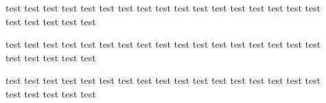 ﻿\documentclass{ctexart}
\begin{document}
    test test test test test test test test test test test test test test test test test\\ test test test test test 

    test test test test test test test test test test test test test test test test test\hspace{20em}\\ test test test test test

    test test test test test test test test test test test test test test test test test\\\hspace{20em} test test test test test 
\end{document}

